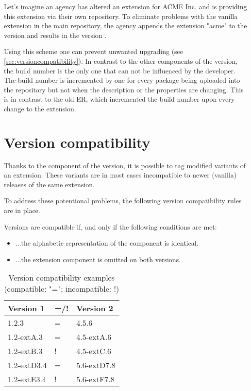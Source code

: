 Let's imagine an agency has altered an extension for ACME Inc. and is providing this extension via their own repository.
To eliminate problems with the vanilla extension in the main repository, the agency appends the extension "acme" to the version and results in the version
.

Using this scheme one can prevent unwanted upgrading (see \ref{sec:versioncompatibility}). In contrast to the other components of the version, the build number is the only one that can not be influenced by the developer. The build number is incremented by one for every package being uploaded into the repository but not when the description or the properties are changing. This is in contrast to the old ER, which incremented the build number upon every change to the extension.

\section[sec:versioncompatibility]{Version compatibility}
Thanks to the  component of the version, it is possible to tag modified variants of an extension. These variants are in most cases incompatible to newer (vanilla) releases of the same extension.

To address these potentional problems, the following version compatibility rules are in place.

Versions are compatible if, and only if the following conditions are met:
\begin{itemize}
  \item ...the alphabetic representation of the  component is identical.
  \item ...the extension component is omitted on both versions.
\end{itemize}

\small
\begin{longtable}{|p{}|p{}|p{}|}
\caption{Version compatibility examples (compatible: "="; incompatible: !)} \\
\hline
\label{tab:versioncompatexamples}
\textbf{Version 1} & \textbf{=/!} & \textbf{Version 2} \\
\hline
 1.2.3 & = & 4.5.6
\\ \hline
 1.2-extA.3 & = & 4.5-extA.6
\\ \hline
 1.2-extB.3 & ! & 4.5-extC.6
\\ \hline
 1.2-extD3.4 & = & 5.6-extD7.8
\\ \hline
 1.2-extE3.4 & ! & 5.6-extF7.8
\\ \hline
\end{longtable}
\normalsize

